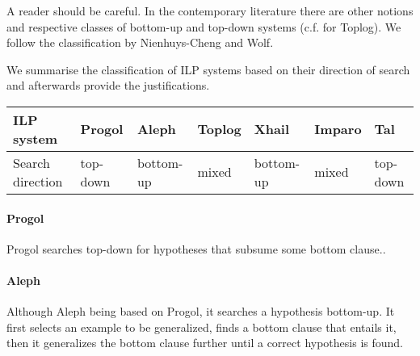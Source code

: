 \begin{remark}
A reader should be careful. In the contemporary literature there are other notions and respective classes of bottom-up and top-down systems (c.f.\cite{corapi2010inductive} for Toplog). We follow the classification by Nienhuys-Cheng and Wolf\cite{nienhuys1997foundations}.
\end{remark}

We summarise the classification of ILP systems based on their direction of search and afterwards provide the justifications.

\begin{center}
\label{tab:title} 
\begin{tabular}{| l | l | l | l | l | l | l |}
    \hline
    ILP system & Progol & Aleph & Toplog & Xhail & Imparo & Tal \\ \hline
   	Search direction & top-down & bottom-up& mixed & bottom-up & mixed & top-down\\ \hline
\end{tabular}
\end{center}

\begin{center}
\end{center}

\paragraph{Progol}
Progol searches top-down for hypotheses that subsume some bottom clause.\cite{nienhuys1997foundations}.
\paragraph{Aleph\cite{aleph2007}}
Although Aleph being based on Progol, it searches a hypothesis bottom-up. It first selects an example to be generalized, finds a bottom clause that entails it, then it generalizes the bottom clause further until a correct hypothesis is found.
